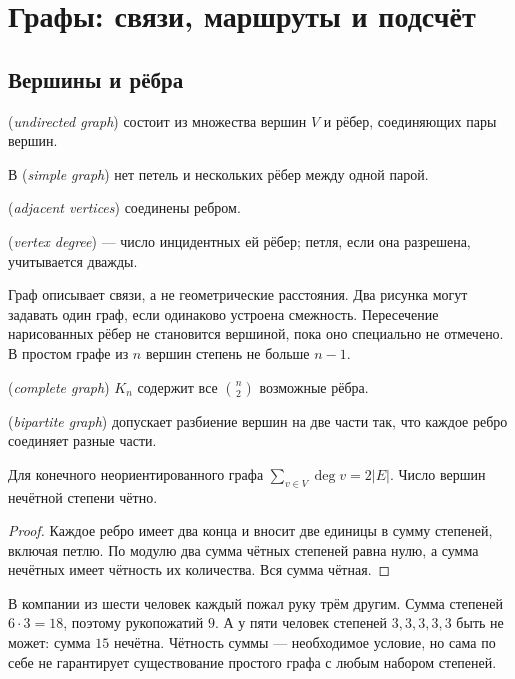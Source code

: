 \chapter{Графы: связи, маршруты и подсчёт}\label{chap:exam-graphs}
\section{Вершины и рёбра}
\begin{definition} (\emph{undirected graph}) состоит из множества вершин \(V\) и рёбер, соединяющих пары вершин. \par В  (\emph{simple graph}) нет петель и нескольких рёбер между одной парой. \par{} (\emph{adjacent vertices}) соединены ребром. \par{} (\emph{vertex degree}) --- число инцидентных ей рёбер; петля, если она разрешена, учитывается дважды.\end{definition}
Граф описывает связи, а не геометрические расстояния. Два рисунка могут задавать один граф, если одинаково устроена смежность. Пересечение нарисованных рёбер не становится вершиной, пока оно специально не отмечено. В простом графе из \(n\) вершин степень не больше \(n-1\). \par{} (\emph{complete graph}) \(K_n\) содержит все \(\binom n2\) возможные рёбра. \par{} (\emph{bipartite graph}) допускает разбиение вершин на две части так, что каждое ребро соединяет разные части.
\begin{theorem}
Для конечного неориентированного графа \(\sum_{v\in V}\deg v=2|E|\). Число вершин нечётной степени чётно.
\end{theorem}
\begin{proof}Каждое ребро имеет два конца и вносит две единицы в сумму степеней, включая петлю. По модулю два сумма чётных степеней равна нулю, а сумма нечётных имеет чётность их количества. Вся сумма чётная.\end{proof}
\begin{example}В компании из шести человек каждый пожал руку трём другим. Сумма степеней \(6\cdot3=18\), поэтому рукопожатий \(9\). А у пяти человек степеней \(3,3,3,3,3\) быть не может: сумма \(15\) нечётна. Чётность суммы --- необходимое условие, но сама по себе не гарантирует существование простого графа с любым набором степеней.\end{example}
